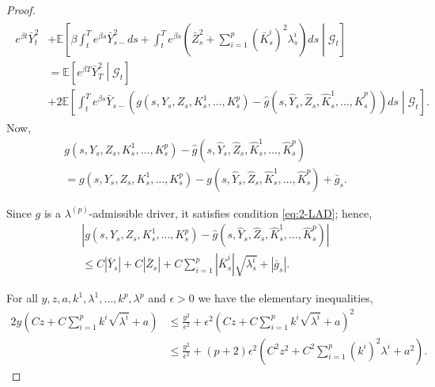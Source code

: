 \documentclass[11pt,a4paper]{article}
\numberwithin{equation}{section}
\theoremstyle{newPlain}
\theoremstyle{newDefinition}
\theoremstyle{newRemark}
\begin{document}
{\begin{proof}
\begin{align}
\begin{aligned}
        e^{\beta t}\bar{Y}_t^2 &+ \mathbb{E}\left[\beta\int_t^Te^{\beta s}\bar{Y}_{s-}^2ds + \int_t^Te^{\beta s}\left(\bar{Z}_s^2+\sum_{i=1}^p(\bar{K}_s^i)^2\lambda_s^i\right)ds\middle|\mathcal{G}_t\right] \\&= \mathbb{E}\left[e^{\beta T}\bar{Y}_T^2\middle|\mathcal{G}_t\right] \\&+ 2\mathbb{E}\left[\int_t^Te^{\beta s}\bar{Y}_{s-}(g(s,Y_s,Z_s,K_s^1,\ldots,K_s^p) - \hat{g}(s,\hat{Y}_s,\hat{Z}_s,\hat{K}_s^1,\ldots,\hat{K}_s^p))ds\middle|\mathcal{G}_t\right].
	\end{aligned}
    \end{align}
    Now,
	\begin{multline*}
	g(s,Y_s,Z_s,K_s^1,\ldots,K_s^p) - \hat{g}(s,\hat{Y}_s,\hat{Z}_s,\hat{K}_s^1,\ldots,\hat{K}_s^p)\\= g(s,Y_s,Z_s,K_s^1,\ldots,K_s^p) - g(s,\hat{Y}_s,\hat{Z}_s,\hat{K}_s^1,\ldots,\hat{K}_s^p) + \bar{g}_s.
	\end{multline*}

Since $g$ is a $\lambda^{(p)}$-admissible driver, it satisfies condition \eqref{eq:2-LAD}; hence,
    \begin{multline*}
        |g(s,Y_s,Z_s,K_s^1,\ldots,K_s^p) - \hat{g}(s,\hat{Y}_s,\hat{Z}_s,\hat{K}_s^1,\ldots,\hat{K}_s^p)| \\\le C|\bar{Y}_s| + C|\bar{Z}_s| + C\sum_{i=1}^p|\bar{K}_s^i|\sqrt{\lambda_s^i} + |\bar{g}_s|.
    \end{multline*}

    For all $y,z, a, k^1,\lambda^1,\ldots,k^p,\lambda^p$ and $\epsilon>0$ we have the elementary inequalities,
    \begin{align*}
        2y\left(Cz + C\sum_{i=1}^pk^i\sqrt{\lambda^i} + a\right) &\le \frac{y^2}{\epsilon^2} + \epsilon^2\left(Cz+C\sum_{i=1}^pk^i\sqrt{\lambda^i} +a\right)^2\\
        &\le \frac{y^2}{\epsilon^2} + (p+2)\epsilon^2\left(C^2z^2 + C^2\sum_{i=1}^p(k^i)^2\lambda^i + a^2\right).
    \end{align*}


\end{proof}}
\end{document}

